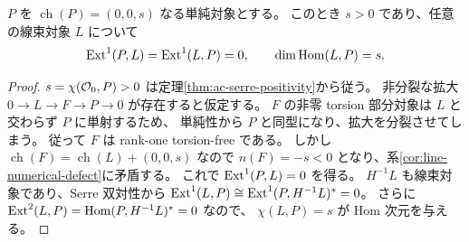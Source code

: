 \begin{lemma}\label{lem:numerical-point-ext}
$P$ を $\operatorname{ch}(P)=(0,0,s)$ なる単純対象とする。
このとき $s>0$ であり、任意の線束対象 $L$ について
\[
 \operatorname{Ext}^1(P,L)=\operatorname{Ext}^1(L,P)=0,\qquad \dim\operatorname{Hom}(L,P)=s.
\]
\end{lemma}
\begin{proof}
$s=\chi(\mathcal O_0,P)>0$ は定理\ref{thm:ac-serre-positivity}から従う。
非分裂な拡大 $0\to L\to F\to P\to0$ が存在すると仮定する。
$F$ の非零 torsion 部分対象は $L$ と交わらず $P$ に単射するため、
単純性から $P$ と同型になり、拡大を分裂させてしまう。
従って $F$ は rank-one torsion-free である。
しかし $\operatorname{ch}(F)=\operatorname{ch}(L)+(0,0,s)$ なので
$n(F)=-s<0$ となり、系\ref{cor:line-numerical-defect}に矛盾する。
これで $\operatorname{Ext}^1(P,L)=0$ を得る。
$H^{-1}L$ も線束対象であり、Serre 双対性から
$\operatorname{Ext}^1(L,P)\cong\operatorname{Ext}^1(P,H^{-1}L)^*=0$。
さらに $\operatorname{Ext}^2(L,P)=\operatorname{Hom}(P,H^{-1}L)^*=0$ なので、
$\chi(L,P)=s$ が Hom 次元を与える。
\end{proof}

